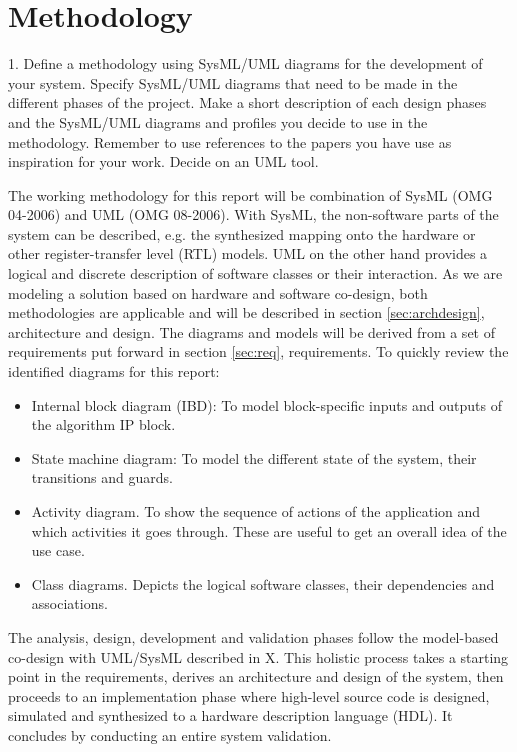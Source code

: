 \section{Methodology}

\begin{framed}
1. Define a methodology using SysML/UML diagrams for the development of your system. Specify SysML/UML diagrams that need to be made in the different phases of the project. Make a short description of each design phases and the SysML/UML diagrams and profiles you decide to use in the methodology. Remember to use references to the papers you have use as inspiration for your work. Decide on an UML tool.
\end{framed}

The working methodology for this report will be combination of SysML \cite{sysml}(OMG 04-2006) and UML \cite{uml} (OMG 08-2006). With SysML, the non-software parts of the system can be described, e.g. the synthesized mapping onto the hardware or other register-transfer level (RTL) models. UML on the other hand provides a logical and discrete description of software classes or their interaction. As we are modeling a solution based on hardware and software co-design, both methodologies are applicable and will be described in section \ref{sec:archdesign}, architecture and design. The diagrams and models will be derived from a set of requirements put forward in section \ref{sec:req}, requirements. To quickly review the identified diagrams for this report:

\begin{itemize}
	\item Internal block diagram (IBD): To model block-specific inputs and outputs of the algorithm IP block.
	\item State machine diagram: To model the different state of the system, their transitions and guards.
	\item Activity diagram. To show the sequence of actions of the application and which activities it goes through. These are useful to get an overall idea of the use case.
	\item Class diagrams. Depicts the logical software classes, their dependencies and associations.
\end{itemize}

The analysis, design, development and validation phases follow the model-based co-design with UML/SysML described in X. This holistic process takes a starting point in the requirements, derives an architecture and design of the system, then proceeds to an implementation phase where high-level source code is designed, simulated and synthesized to a hardware description language (HDL). It concludes by conducting an entire system validation.
